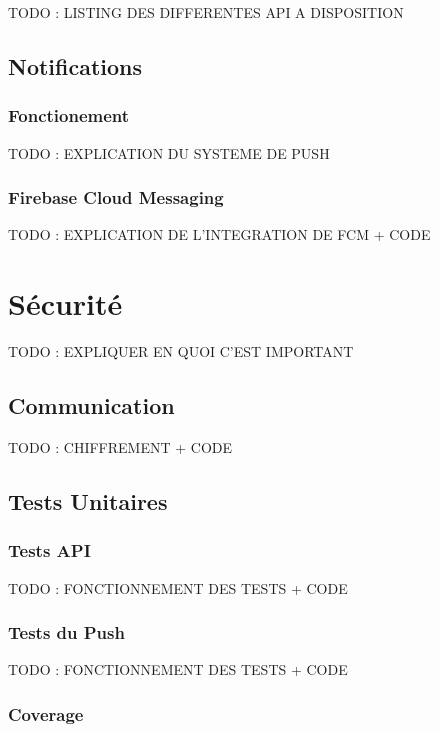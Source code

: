 \documentclass[french]{article}
\begin{document}
	TODO : LISTING DES DIFFERENTES API A DISPOSITION
	
	\subsection{Notifications}
	\subsubsection{Fonctionement}
	
	TODO : EXPLICATION DU SYSTEME DE PUSH
	
	\subsubsection{Firebase Cloud Messaging}
	
	TODO : EXPLICATION DE L'INTEGRATION DE FCM + CODE
	
	
	
	\section{Sécurité}
	
	TODO : EXPLIQUER EN QUOI C'EST IMPORTANT
	
	\subsection{Communication}
	
	TODO : CHIFFREMENT + CODE
	
	\subsection{Tests Unitaires}
	\subsubsection{Tests API}
	
	TODO : FONCTIONNEMENT DES TESTS + CODE
	
	\subsubsection{Tests du Push}
	
	TODO : FONCTIONNEMENT DES TESTS + CODE
	
	\subsubsection{Coverage}
	
\end{document}
